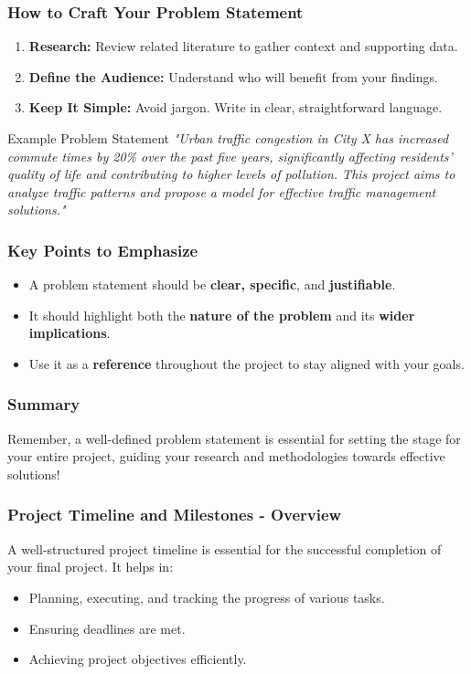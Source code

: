 \documentclass[aspectratio=169]{beamer}
\begin{document}
\begin{frame}[fragile]
    \frametitle{How to Craft Your Problem Statement}
    \begin{enumerate}
        \item \textbf{Research:} Review related literature to gather context and supporting data.
        \item \textbf{Define the Audience:} Understand who will benefit from your findings.
        \item \textbf{Keep It Simple:} Avoid jargon. Write in clear, straightforward language.
    \end{enumerate}

    \begin{block}{Example Problem Statement}
        \emph{"Urban traffic congestion in City X has increased commute times by 20\% over the past five years, significantly affecting residents' quality of life and contributing to higher levels of pollution. This project aims to analyze traffic patterns and propose a model for effective traffic management solutions."}
    \end{block}
\end{frame}

\begin{frame}[fragile]
    \frametitle{Key Points to Emphasize}
    \begin{itemize}
        \item A problem statement should be \textbf{clear, specific}, and \textbf{justifiable}.
        \item It should highlight both the \textbf{nature of the problem} and its \textbf{wider implications}.
        \item Use it as a \textbf{reference} throughout the project to stay aligned with your goals.
    \end{itemize}
\end{frame}

\begin{frame}[fragile]
    \frametitle{Summary}
    Remember, a well-defined problem statement is essential for setting the stage for your entire project, guiding your research and methodologies towards effective solutions!
\end{frame}

\begin{frame}[fragile]
    \frametitle{Project Timeline and Milestones - Overview}
    A well-structured project timeline is essential for the successful completion of your final project. It helps in:
    \begin{itemize}
        \item Planning, executing, and tracking the progress of various tasks.
        \item Ensuring deadlines are met.
        \item Achieving project objectives efficiently.
    \end{itemize}
\end{frame}
\end{document}
